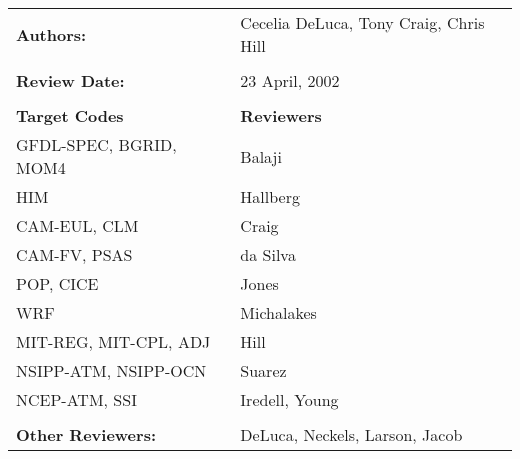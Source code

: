 
\begin{tabular}{l l}

{\bf Authors:} & Cecelia DeLuca, Tony Craig, Chris Hill \\ \\

{\bf Review Date:}            & 23 April, 2002 \\ \\

{\bf Target Codes}            & {\bf Reviewers} \\
GFDL-SPEC, BGRID, MOM4        & Balaji \\ 
HIM                           & Hallberg \\
CAM-EUL, CLM                  & Craig \\
CAM-FV, PSAS                  & da Silva\\
POP, CICE                     & Jones \\
WRF                           & Michalakes \\
MIT-REG, MIT-CPL, ADJ         & Hill \\
NSIPP-ATM, NSIPP-OCN          & Suarez \\
NCEP-ATM, SSI                 & Iredell, Young \\ \\

{\bf Other Reviewers:}        & DeLuca, Neckels, Larson, Jacob

\end{tabular}


